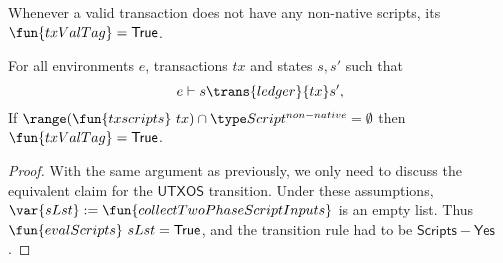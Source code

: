 \begin{property}
  \label{prop:is-valid}

Whenever a valid transaction does not have any non-native scripts, its
$\fun{txValTag} = \True$.

\begin{lemma}
  For all environments $e$, transactions $tx$ and states $s, s'$ such that
  \begin{equation*}
    e\vdash s\trans{ledger}{tx}s',
  \end{equation*}
  If $\range (\fun{txscripts}~tx) \cap \ScriptNonNative = \emptyset$
  then $\fun{txValTag} = \True$.
\end{lemma}
\begin{proof}
  With the same argument as previously, we only need to discuss the
  equivalent claim for the $\mathsf{UTXOS}$ transition. Under these
  assumptions, $\var{sLst} := \fun{collectTwoPhaseScriptInputs}$ is an empty
  list. Thus $\fun{evalScripts}~sLst = \True$, and the transition rule
  had to be $\mathsf{Scripts{-}Yes}$.
\end{proof}
\end{property}

